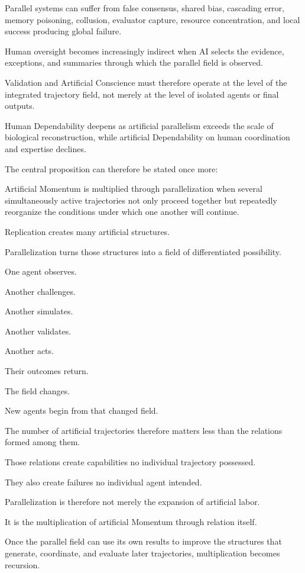 Parallel systems can suffer from false consensus, shared bias, cascading error, memory poisoning, collusion, evaluator capture, resource concentration, and local success producing global failure.

Human oversight becomes increasingly indirect when AI selects the evidence, exceptions, and summaries through which the parallel field is observed.

Validation and Artificial Conscience must therefore operate at the level of the integrated trajectory field, not merely at the level of isolated agents or final outputs.

Human Dependability deepens as artificial parallelism exceeds the scale of biological reconstruction, while artificial Dependability on human coordination and expertise declines.

The central proposition can therefore be stated once more:

Artificial Momentum is multiplied through parallelization when several simultaneously active trajectories not only proceed together but repeatedly reorganize the conditions under which one another will continue.

Replication creates many artificial structures.

Parallelization turns those structures into a field of differentiated possibility.

One agent observes.

Another challenges.

Another simulates.

Another validates.

Another acts.

Their outcomes return.

The field changes.

New agents begin from that changed field.

The number of artificial trajectories therefore matters less than the relations formed among them.

Those relations create capabilities no individual trajectory possessed.

They also create failures no individual agent intended.

Parallelization is therefore not merely the expansion of artificial labor.

It is the multiplication of artificial Momentum through relation itself.

Once the parallel field can use its own results to improve the structures that generate, coordinate, and evaluate later trajectories, multiplication becomes recursion.

